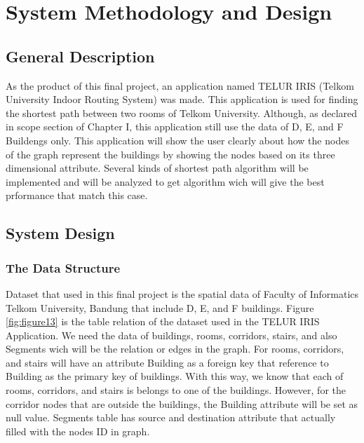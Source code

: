 \chapter{System Methodology and Design}
\section{General Description}
As the product of this final project, an application named TELUR IRIS (Telkom University Indoor Routing System) was made. This application is used for finding the shortest path between two rooms of Telkom University. Although, as declared in scope section of Chapter I, this application still use the data of D, E, and F Buildengs only. This application will show the user clearly about how the nodes of the graph represent the buildings by showing the nodes based on its three dimensional attribute. Several kinds of shortest path algorithm will be implemented and will be analyzed to get algorithm wich will give the best prformance that match this case.
  
\section{System Design}

\subsection{The Data Structure}
Dataset that used in this final project is the spatial data of Faculty of Informatics Telkom University, Bandung that include D, E, and F buildings. Figure \ref{fig:figure13} is the table relation of the dataset used in the TELUR IRIS Application. We need the data of buildings, rooms, corridors, stairs, and also Segments wich will be the relation or edges in the graph. For rooms, corridors, and stairs will have an attribute Building as a foreign key that reference to Building as the primary key of buildings. With this way, we know that each of rooms, corridors, and stairs is belongs to one of the buildings. However, for the corridor nodes that are outside the buildings, the Building attribute will be set as null value. Segments table has source and destination attribute that actually filled with the nodes ID in graph. 

\vspace{60mm}

